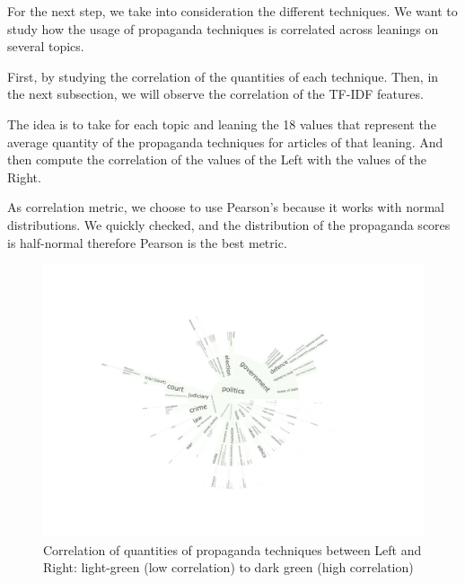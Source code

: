 


For the next step, we take into consideration the different techniques. We want to study how the usage of propaganda techniques is correlated across leanings on several topics.

First, by studying the correlation of the quantities of each technique. Then, in the next subsection, we will observe the correlation of the TF-IDF features.

The idea is to take for each topic and leaning the 18 values that represent the average quantity of the propaganda techniques for articles of that leaning. And then compute the correlation of the values of the Left with the values of the Right.

As correlation metric, we choose to use Pearson's because it works with normal distributions. We quickly checked, and the distribution of the propaganda scores is half-normal therefore Pearson is the best metric.

\begin{figure}[!htbp]
    \centering
    \includegraphics[trim={2.2cm 2cm 2.2cm 2cm},clip,width=\linewidth]{figures/baly_iptc_weighted_prop_leaning_corr.pdf}
    \caption{Correlation of quantities of propaganda techniques between Left and Right: light-green (low correlation) to dark green (high correlation)}
    \label{fig:baly_iptc_weighted_prop_leaning_corr}
\end{figure}

